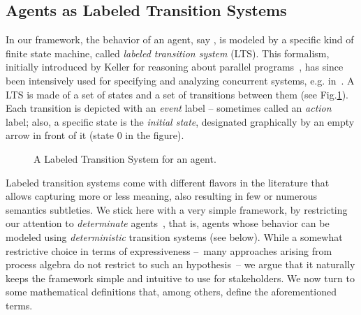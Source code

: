 \subsection{Agents as Labeled Transition Systems}

In our framework, the behavior of an agent, say , is modeled by a specific kind of finite state machine, called \emph{labeled transition system} (LTS). This formalism, initially introduced by Keller for reasoning about parallel programs~\cite{Keller:1976}, has since been intensively used for specifying and analyzing concurrent systems, e.g. in~\cite{Milner:1989, Clarke:1989, Magee:1997}. A LTS is made of a set of states and a set of transitions between them (see Fig.\ref{image:framework-start-stop}). Each transition is depicted with an \emph{event} label -- sometimes called an \emph{action} label; also, a specific state is the \emph{initial state}, designated graphically by an empty arrow in front of it (state 0 in the figure). 

\vspace{0.5cm}
\begin{figure}[H]
\centering{}
  \caption{A Labeled Transition System for an  agent\label{image:framework-start-stop}.}
\end{figure}

Labeled transition systems come with different flavors in the literature that allows capturing more or less meaning, also resulting in few or numerous semantics subtleties. We stick here with a very simple framework, by restricting our attention to \emph{determinate} agents~\cite{Engelfriet:1985}, that is, agents whose behavior can be modeled using \emph{deterministic} transition systems (see below). While a somewhat restrictive choice in terms of expressiveness --~many approaches arising from process algebra do not restrict to such an hypothesis~-- we argue that it naturally keeps the framework simple and intuitive to use for stakeholders. We now turn to some mathematical definitions that, among others, define the aforementioned terms.

